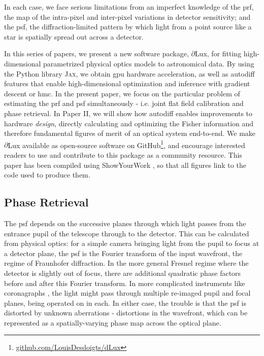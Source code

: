 \documentclass[twocolumn]{spie}
\newcommand\dlux{$\partial$Lux\xspace}
\begin{document}
In each case, we face serious limitations from an imperfect knowledge of the \ac{prf}, the map of the intra-pixel and inter-pixel variations in detector sensitivity; and the \ac{psf}, the diffraction-limited pattern by which light from a point source like a star is spatially spread out across a detector.

In this series of papers, we present a new software package, \dlux, for fitting high-dimensional parametrized physical optics models to astronomical data. By using the Python library \textsc{Jax}\cite{jax}, we obtain \ac{gpu} hardware acceleration, as well as autodiff\cite{Margossian2018} features that enable high-dimensional optimization and inference with gradient descent or \ac{hmc}. In the present paper, we focus on the particular problem of estimating the \ac{prf} and \ac{psf} simultaneously - i.e. joint flat field calibration and phase retrieval. In Paper II, we will show how autodiff enables improvements to hardware \textit{design}, directly calculating and optimizing the Fisher information and therefore fundamental figures of merit of an optical system end-to-end. We make \dlux available as open-source software on GitHub\footnote{\href{https://github.com/LouisDesdoigts/dLux}{github.com/LouisDesdoigts/dLux}}, and encourage interested readers to use and contribute to this package as a community resource. This paper has been compiled using ShowYourWork \cite{Luger2021}, so that all figures link to the code used to produce them.

\subsection{Phase Retrieval}
The \ac{psf} depends on the successive planes through which light passes from the entrance pupil of the telescope through to the detector. This can be calculated from physical optics: for a simple camera bringing light from the pupil to focus at a detector plane, the \ac{psf} is the Fourier transform of the input wavefront, the regime of Fraunhofer diffraction. In the more general Fresnel regime where the detector is slightly out of focus, there are additional quadratic phase factors before and after this Fourier transform. In more complicated instruments like coronagraphs \cite{Bowler2016}, the light might pass through multiple re-imaged pupil and focal planes, being operated on in each. In either case, the trouble is that the \ac{psf} is distorted by unknown aberrations - distortions in the wavefront, which can be represented as a spatially-varying phase map across the optical plane. 
\end{document}
